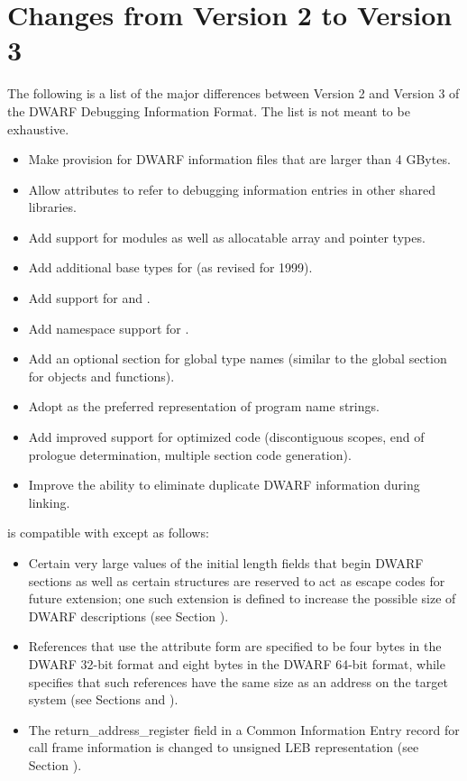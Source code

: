 \section{Changes from Version 2 to Version 3}
The following is a list of the major differences between
Version 2 and Version 3 of the DWARF Debugging Information
Format. The list is not meant to be exhaustive.
\begin{itemize}
\item
Make provision for DWARF information files that are larger
than 4 GBytes.
\item
Allow attributes to refer to debugging information entries
in other shared libraries.
\item
Add support for  modules as well as allocatable
array and pointer types.
\item
Add additional base types for  (as revised for 1999).
\item
Add support for  and .
\item
Add namespace support for .
\item
Add an optional section for global type names (similar to
the global section for objects and functions).
\item
Adopt  as the preferred representation of program name strings.
\item
Add improved support for optimized code (discontiguous
scopes, end of prologue determination, multiple section
code generation).  
\item Improve the ability to eliminate
duplicate DWARF information during linking.  
\end{itemize}

is compatible with 
 except as follows:
\begin{itemize}
\item
Certain very large values of the initial length fields that
begin DWARF sections as well as certain structures are reserved
to act as escape codes for future extension; one such extension
is defined to increase the possible size of DWARF descriptions
(see Section ).
\item
References that use the attribute form 
\DWFORMrefaddrNAME{}
are specified to be four bytes in the DWARF 32-bit format and
eight bytes in the DWARF 64-bit format, while 
specifies that such references have the same size as an
address on the target system (see Sections 
 and 
).
\item
The return\_address\_register field in a Common Information
Entry record for call frame information is changed to unsigned
LEB representation (see Section 
).
\end{itemize}

